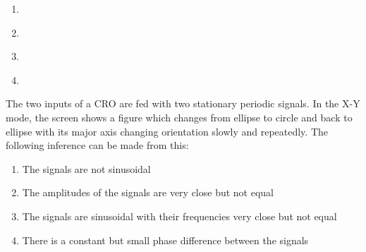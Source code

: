 \begin{enumerate}

\item 
    \label{fig:my_label}

\item {}%

\label{fig:my_label}
\item {}%

\label{fig:my_label}

\item {}%


\label{fig:my_label}


\end{enumerate}



\item The two inputs of a CRO are fed with two stationary periodic signals. In the X-Y mode, the screen shows a figure which changes from ellipse to circle and back to ellipse with its major axis changing orientation slowly and repeatedly. The following inference can be made from this:

\begin{enumerate}
\item The signals are not sinusoidal
\item The amplitudes of the signals are very close but not equal
\item The signals are sinusoidal with their frequencies very close but not equal
\item There is a constant but small phase difference between the signals
\end{enumerate}

